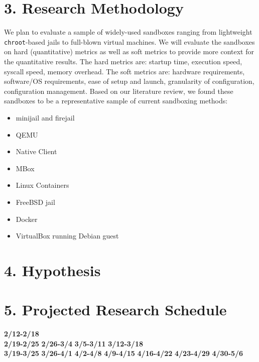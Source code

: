 \documentclass{proc}
\begin{document}
\section*{3. Research Methodology}
We plan to evaluate a sample of widely-used sandboxes ranging from lightweight \texttt{chroot}-based jails to full-blown virtual machines. We will evaluate the sandboxes on hard (quantitative) metrics as well as soft metrics to provide more context for the quantitative results. The hard metrics are: startup time, execution speed, syscall speed, memory overhead. The soft metrics are: hardware requirements, software/OS requirements, ease of setup and launch, granularity of configuration, configuration management.
Based on our literature review, we found these sandboxes to be a representative sample of current sandboxing methods:\vspace{0.5em}
{\small
\begin{itemize}
\item minijail and firejail
\item QEMU
\item Native Client
\item MBox
\item Linux Containers
\item FreeBSD jail
\item Docker
\item VirtualBox running Debian guest
\end{itemize}
}

\section*{4. Hypothesis}

\section*{5. Projected Research Schedule}
\textbf{2/12-2/18} \\
\textbf{2/19-2/25}
\textbf{2/26-3/4}
\textbf{3/5-3/11}
\textbf{3/12-3/18} \\
\textbf{3/19-3/25}
\textbf{3/26-4/1}
\textbf{4/2-4/8}
\textbf{4/9-4/15}
\textbf{4/16-4/22}
\textbf{4/23-4/29}
\textbf{4/30-5/6}  






\end{document}
